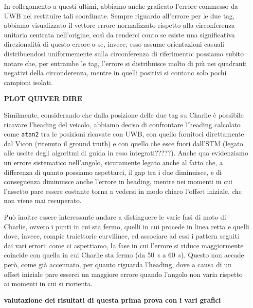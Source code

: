 In collegamento a questi ultimi, abbiamo anche graficato l'errore commesso da UWB nel restituire tali coordinate.
Sempre riguardo all'errore per le due tag, abbiamo visualizzato il vettore errore normalizzato rispetto alla circonferenza unitaria centrata nell'origine, così da 
renderci conto se esiste una significativa direzionalità di questo errore o se, invece, esso assume orientazioni casuali distribuendosi uniformemente sulla 
circonferenza di riferimento: possiamo subito notare che, per entrambe le tag, l'errore si distribuisce molto di più nei quadranti negativi della circonderenza,
mentre in quelli positivi si contano solo pochi campioni isolati.

\textbf{PLOT QUIVER DIRE}

Similmente, considerando che dalla posizione delle due tag su Charlie è possibile ricavare l'heading del veicolo, abbiamo deciso di confrontare l'heading calcolato
come \verb|atan2| tra le posizioni ricavate con UWB, con quello fornitoci direttamente dal Vicon (ritenuto il ground truth) e con quello che esce fuori dall'STM 
(legato alle uscite degli algoritmi di guida in esso integrati?????). Anche qua evidenziamo un errore sistematico nell'angolo, sicuramente legato anche al fatto 
che, a differenza di quanto possiamo aspettarci, il gap tra i due diminuisce, e di conseguenza diminuisce anche l'errore in heading, mentre nei momenti in cui 
l'assetto pare essere costante torna a vedersi in modo chiaro l'offset iniziale, che non viene mai recuperato.

Può inoltre essere interessante andare a distinguere le varie fasi di moto di Charlie, ovvero i punti in cui sta fermo, quelli in cui procede in linea retta e 
quelli dove, invece, compie traiettorie curvilinee, ed associare ad essi i pattern seguiti dai vari errori: come ci aspettiamo, la fase in cui l'errore si riduce 
maggiormente coincide con quella in cui Charlie sta fermo (da \SI{50}{\second} a \SI{60}{\second}). Questo non accade però, come già accennato, per quanto riguarda l'heading, 
dove a causa di un offset iniziale pare esserci un maggiore errore quando l'angolo non varia rispetto ai momenti in cui si riorienta.

\textbf{valutazione dei risultati di questa prima prova con i vari grafici}


